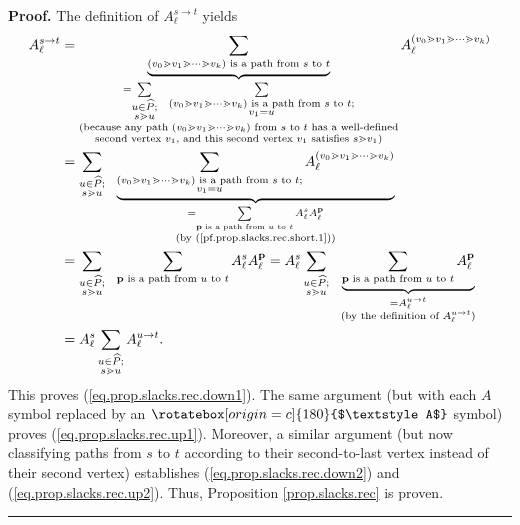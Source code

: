 \documentclass[numbers=enddot,12pt,final,onecolumn,notitlepage]{scrartcl}%
\theoremstyle{definition}
\newenvironment{vershort}{}{}
\newcommand{\upslack}{\mathchoice{\rotatebox[origin=c]{180}{$\displaystyle A$}}{\rotatebox[origin=c]{180}{$\textstyle A$}}{\rotatebox[origin=c]{180}{$\scriptstyle A$}}{\rotatebox[origin=c]{180}{$\scriptscriptstyle A$}}}
\newcommand{\downslack}{A}
\newenvironment{proof}[1][Proof]{\noindent\textbf{#1.} }{\ \rule{0.5em}{0.5em}}
\let\sumnonlimits\sum
\renewcommand{\sum}{\sumnonlimits\limits}
\begin{document}
\begin{vershort}
\begin{proof}
The definition of $\downslack_{\ell}^{s\rightarrow t}$ yields%
\begin{align*}
\downslack_{\ell}^{s\rightarrow t}  &  =\underbrace{\sum_{\left(  v_{0}\gtrdot
v_{1}\gtrdot\cdots\gtrdot v_{k}\right)  \text{ is a path from }s\text{ to }t}%
}_{\substack{=\sum_{\substack{u\in\widehat{P};\\s\gtrdot u}}\ \ \sum
_{\substack{\left(  v_{0}\gtrdot v_{1}\gtrdot\cdots\gtrdot v_{k}\right)
\text{ is a path from }s\text{ to }t;\\v_{1}=u}}\\\text{(because any path
}\left(  v_{0}\gtrdot v_{1}\gtrdot\cdots\gtrdot v_{k}\right)  \text{ from
}s\text{ to }t\text{ has a well-defined}\\\text{second vertex }v_{1}\text{,
and this second vertex }v_{1}\text{ satisfies }s\gtrdot v_{1}\text{)}%
}}\downslack_{\ell}^{\left(  v_{0}\gtrdot v_{1}\gtrdot\cdots\gtrdot
v_{k}\right)  }\\
&  =\sum_{\substack{u\in\widehat{P};\\s\gtrdot u}}\ \ \underbrace{\sum
_{\substack{\left(  v_{0}\gtrdot v_{1}\gtrdot\cdots\gtrdot v_{k}\right)
\text{ is a path from }s\text{ to }t;\\v_{1}=u}}\downslack_{\ell}^{\left(
v_{0}\gtrdot v_{1}\gtrdot\cdots\gtrdot v_{k}\right)  }}_{\substack{=\sum
_{\mathbf{p}\text{ is a path from }u\text{ to }t}\downslack_{\ell}%
^{s}\downslack_{\ell}^{\mathbf{p}}\\\text{(by
(\ref{pf.prop.slacks.rec.short.1}))}}}\\
&  =\sum_{\substack{u\in\widehat{P};\\s\gtrdot u}}\ \ \sum_{\mathbf{p}\text{
is a path from }u\text{ to }t}\downslack_{\ell}^{s}\downslack_{\ell
}^{\mathbf{p}}=\downslack_{\ell}^{s}\sum_{\substack{u\in\widehat{P};\\s\gtrdot
u}}\ \ \underbrace{\sum_{\mathbf{p}\text{ is a path from }u\text{ to }%
t}\downslack_{\ell}^{\mathbf{p}}}_{\substack{=\downslack_{\ell}^{u\rightarrow
t}\\\text{(by the definition of }\downslack_{\ell}^{u\rightarrow t}\text{)}%
}}\\
&  =\downslack_{\ell}^{s}\sum_{\substack{u\in\widehat{P};\\s\gtrdot
u}}\downslack_{\ell}^{u\rightarrow t}.
\end{align*}
This proves (\ref{eq.prop.slacks.rec.down1}). The same argument (but with each
$\downslack$ symbol replaced by an $\upslack$ symbol) proves
(\ref{eq.prop.slacks.rec.up1}). Moreover, a similar argument (but now
classifying paths from $s$ to $t$ according to their second-to-last vertex
instead of their second vertex) establishes (\ref{eq.prop.slacks.rec.down2})
and (\ref{eq.prop.slacks.rec.up2}). Thus, Proposition \ref{prop.slacks.rec} is proven.
\end{proof}
\end{vershort}
\end{document}
